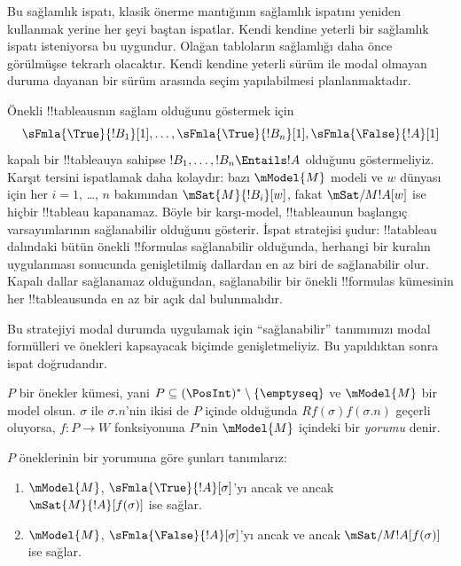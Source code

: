 



\begin{editorial}
  Bu sağlamlık ispatı, klasik önerme mantığının sağlamlık ispatını yeniden
  kullanmak yerine her şeyi baştan ispatlar. Kendi kendine yeterli bir sağlamlık
  ispatı isteniyorsa bu uygundur. Olağan tabloların sağlamlığı daha önce
  görülmüşse tekrarlı olacaktır. Kendi kendine yeterli sürüm ile modal olmayan
  duruma dayanan bir sürüm arasında seçim yapılabilmesi planlanmaktadır.
\end{editorial}

\begin{explain}
  Önekli !!{tableau}s{}nın sağlam olduğunu göstermek için
  \[
  \sFmla{\True}{!B_1}[1], \dots, \sFmla{\True}{!B_n}[1], \sFmla{\False}{!A}[1]
  \]
  kapalı bir !!{tableau}{}ya sahipse $!B_1, \dots, !B_n \Entails !A$ olduğunu
  göstermeliyiz. Karşıt tersini ispatlamak daha kolaydır: bazı $\mModel{M}$
  modeli ve $w$ dünyası için her $i=1$, \dots, $n$ bakımından
  $\mSat{M}{!B_i}[w]$, fakat $\mSat/{M}{!A}[w]$ ise hiçbir !!{tableau}
  kapanamaz. Böyle bir karşı-model, !!{tableau}{}nun başlangıç varsayımlarının
  sağlanabilir olduğunu gösterir. İspat stratejisi şudur: !!a{tableau} dalındaki
  bütün önekli !!{formula}s sağlanabilir olduğunda, herhangi bir kuralın
  uygulanması sonucunda genişletilmiş dallardan en az biri de sağlanabilir
  olur. Kapalı dallar sağlanamaz olduğundan, sağlanabilir bir önekli
  !!{formula}s kümesinin her !!{tableau}{}sunda en az bir açık dal bulunmalıdır.

  Bu stratejiyi modal durumda uygulamak için ``sağlanabilir'' tanımımızı modal
  formülleri ve önekleri kapsayacak biçimde genişletmeliyiz. Bu yapıldıktan
  sonra ispat doğrudandır.
\end{explain}

\begin{defn}
  $P$ bir önekler kümesi, yani $P \subseteq (\PosInt)^*
  \setminus \{\emptyseq\}$ ve $\mModel{M}$ bir model olsun. $\sigma$ ile
  $\sigma.n$'nin ikisi de $P$ içinde olduğunda $Rf(\sigma)f(\sigma.n)$
  geçerli oluyorsa, $f\colon P \to W$ fonksiyonuna $P$'nin $\mModel{M}$
  içindeki bir \emph{yorumu} denir.

  $P$ öneklerinin bir yorumuna göre şunları tanımlarız:
  \begin{enumerate}
  \item $\mModel{M}$, $\sFmla{\True}{!A}[\sigma]$'yı ancak ve ancak
    $\mSat{M}{!A}[f(\sigma)]$ ise sağlar.
  \item $\mModel{M}$, $\sFmla{\False}{!A}[\sigma]$'yı ancak ve ancak
    $\mSat/{M}{!A}[f(\sigma)]$ ise sağlar.
  \end{enumerate}
\end{defn}

